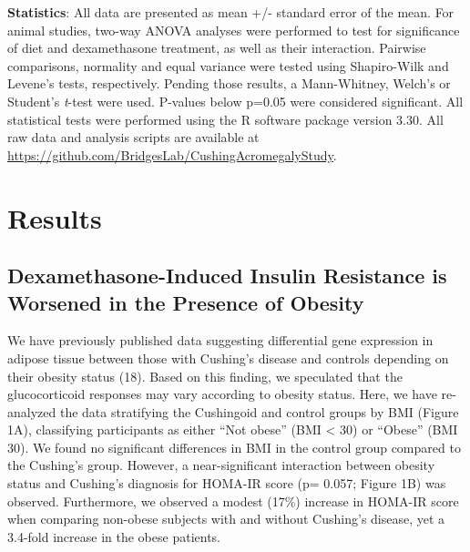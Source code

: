 \documentclass[11pt]{article} %
\begin{document}
\textbf{Statistics}: All data are presented as mean +/- standard error
of the mean. For animal studies, two-way ANOVA analyses were performed
to test for significance of diet and dexamethasone treatment, as well as
their interaction. Pairwise comparisons, normality and equal variance
were tested using Shapiro-Wilk and Levene's tests, respectively. Pending
those results, a Mann-Whitney, Welch's or Student's \emph{t}-test were
used. P-values below p=0.05 were considered significant. All statistical
tests were performed using the R software package version 3.30. All raw
data and analysis scripts are available at
\url{https://github.com/BridgesLab/CushingAcromegalyStudy}.

\section*{Results}

\subsection*{Dexamethasone-Induced Insulin Resistance is Worsened in the
Presence of Obesity
}\label{dexamethasone-induced-insulin-resistance-is-worsened-in-the-presence-of-obesity}

We have previously published data suggesting differential gene
expression in adipose tissue between those with Cushing's disease and
controls depending on their obesity status (18). Based on this finding,
we speculated that the glucocorticoid responses may vary according to
obesity status. Here, we have re-analyzed the data stratifying the
Cushingoid and control groups by BMI (Figure 1A), classifying
participants as either ``Not obese'' (BMI \textless{} 30) or ``Obese''
(BMI  30). We found no significant differences in BMI in the control
group compared to the Cushing's group. However, a near-significant
interaction between obesity status and Cushing's diagnosis for HOMA-IR
score (p= 0.057; Figure 1B) was observed. Furthermore, we observed a
modest (17\%) increase in HOMA-IR score when comparing non-obese
subjects with and without Cushing's disease, yet a 3.4-fold increase in
the obese patients.
\end{document}
